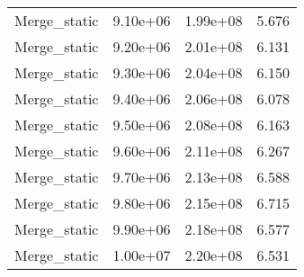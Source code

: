 \begin{table}
\begin{tabular}{llll}
Merge_static & 9.10e+06 & 1.99e+08 & 5.676 \\
Merge_static & 9.20e+06 & 2.01e+08 & 6.131 \\
Merge_static & 9.30e+06 & 2.04e+08 & 6.150 \\
Merge_static & 9.40e+06 & 2.06e+08 & 6.078 \\
Merge_static & 9.50e+06 & 2.08e+08 & 6.163 \\
Merge_static & 9.60e+06 & 2.11e+08 & 6.267 \\
Merge_static & 9.70e+06 & 2.13e+08 & 6.588 \\
Merge_static & 9.80e+06 & 2.15e+08 & 6.715 \\
Merge_static & 9.90e+06 & 2.18e+08 & 6.577 \\
Merge_static & 1.00e+07 & 2.20e+08 & 6.531 \\
\bottomrule
\end{tabular}
\end{table}
